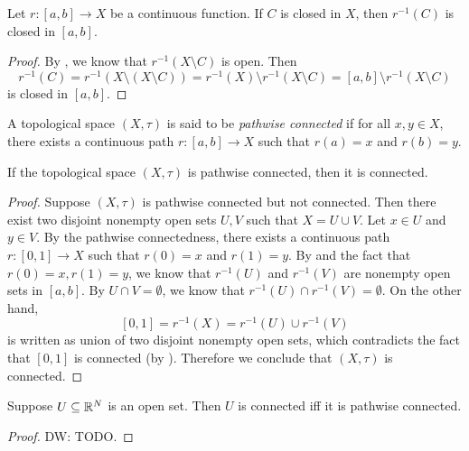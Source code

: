 \documentclass[screen]{techreport}
\numberwithin{equation}{section}
\newcommand{\diw}[1]{{\color{Red} DW: #1}}
\begin{document}
\begin{proposition}\label{Prop:ContinuousReverseClosedIsClosed}
	Let $r : [a,b] \to X$ be a continuous function.
	If $C$ is closed in $X$, then $r^{-1}(C)$ is closed in $[a,b]$.
\end{proposition}
\begin{proof}
	By , we know that $r^{-1}(X \setminus C)$ is open.
	Then
	\[
	r^{-1}(C) = r^{-1}(X \setminus (X \setminus C)) = r^{-1}(X) \setminus r^{-1}(X \setminus C) = [a,b] \setminus r^{-1}(X\setminus C)
	\]
	is closed in $[a,b]$.
\end{proof}

\begin{definition}\label{De:PathwiseConnected}
	A topological space $(X,\tau)$ is said to be \emph{pathwise connected} if for all $x,y \in X$, there exists a continuous path $r : [a,b] \to X$ such that $r(a) =x$ and $r(b)=y$.
\end{definition}

\begin{proposition}\label{Prop:PathWiseConnImplyConn}
	If the topological space $(X,\tau)$ is pathwise connected, then it is connected.
\end{proposition}
\begin{proof}
	Suppose $(X,\tau)$ is pathwise connected but not connected.
	Then there exist two disjoint nonempty open sets $U,V$ such that $X = U \cup V$.
	Let $x \in U$ and $y \in V$.
	By the pathwise connectedness, there exists a continuous path $r : [0,1] \to X$ such that $r(0)=x$ and $r(1)=y$.
	By  and the fact that $r(0)=x,r(1)=y$, we know that $r^{-1}(U)$ and $r^{-1}(V)$ are nonempty open sets in $[a,b]$.
	By $U \cap V = \emptyset$, we know that $r^{-1}(U) \cap r^{-1}(V) = \emptyset$.
	On the other hand,
	\[
	[0,1] = r^{-1}(X) = r^{-1}(U) \cup r^{-1}(V)
	\]
	is written as union of two disjoint nonempty open sets, which contradicts the fact that $[0,1]$ is connected (by ).
	Therefore we conclude that $(X,\tau)$ is connected.
\end{proof}

\begin{proposition}\label{Prop:OpenSetInEuclideanSpaceConn}
	Suppose $U \subseteq \mathbb{R}^N$ is an open set.
	Then $U$ is connected iff it is pathwise connected.
\end{proposition}
\begin{proof}
	\diw{TODO.}
\end{proof}
\end{document}
